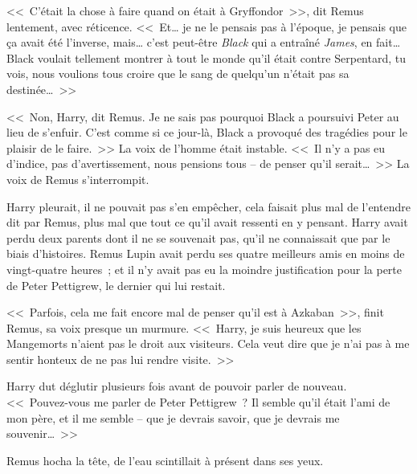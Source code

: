 <<~C'était la chose à faire quand on était à Gryffondor~>>, dit Remus lentement, avec réticence. <<~Et… je ne le pensais pas à l'époque, je pensais que ça avait été l'inverse, mais… c'est peut-être \emph{Black} qui a entraîné \emph{James}, en fait… Black voulait tellement montrer à tout le monde qu'il était contre Serpentard, tu vois, nous voulions tous croire que le sang de quelqu'un n'était pas sa destinée…~>>

\later

<<~Non, Harry, dit Remus. Je ne sais pas pourquoi Black a poursuivi Peter au lieu de s'enfuir. C'est comme si ce jour-là, Black a provoqué des tragédies pour le plaisir de le faire.~>> La voix de l'homme était instable. <<~Il n'y a pas eu d'indice, pas d'avertissement, nous pensions tous -- de penser qu'il serait…~>> La voix de Remus s'interrompit.

Harry pleurait, il ne pouvait pas s'en empêcher, cela faisait plus mal de l'entendre dit par Remus, plus mal que tout ce qu'il avait ressenti en y pensant. Harry avait perdu deux parents dont il ne se souvenait pas, qu'il ne connaissait que par le biais d'histoires. Remus Lupin avait perdu ses quatre meilleurs amis en moins de vingt-quatre heures~; et il n'y avait pas eu la moindre justification pour la perte de Peter Pettigrew, le dernier qui lui restait.

<<~Parfois, cela me fait encore mal de penser qu'il est à Azkaban~>>, finit Remus, sa voix presque un murmure. <<~Harry, je suis heureux que les Mangemorts n'aient pas le droit aux visiteurs. Cela veut dire que je n'ai pas à me sentir honteux de ne pas lui rendre visite.~>>

Harry dut déglutir plusieurs fois avant de pouvoir parler de nouveau. <<~Pouvez-vous me parler de Peter Pettigrew~? Il semble qu'il était l'ami de mon père, et il me semble -- que je devrais savoir, que je devrais me souvenir…~>>

Remus hocha la tête, de l'eau scintillait à présent dans ses yeux.


